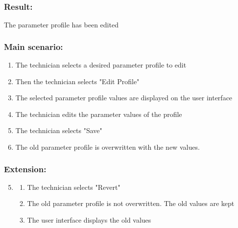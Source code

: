 \begin{framed}
\subsubsection*{Result:}
The parameter profile has been edited

\subsubsection*{Main scenario:}
\begin{enumerate}
	\item The technician selects a desired parameter profile to edit
	\item Then the technician selects "Edit Profile"
	\item The selected parameter profile values are displayed on the user interface
	\item The technician edits the parameter values of the profile
	\item The technician selects "Save"
	\item The old parameter profile is overwritten with the new values.
\end{enumerate}	

\subsubsection*{Extension:}
\begin{enumerate}
	\setcounter{enumi}{4}
	\item 
	\begin{enumerate}
		\item The technician selects "Revert"
		\item The old parameter profile is not overwritten. The old values are kept
		\item The user interface displays the old values
	\end{enumerate}
\end{enumerate}
\end{framed}

